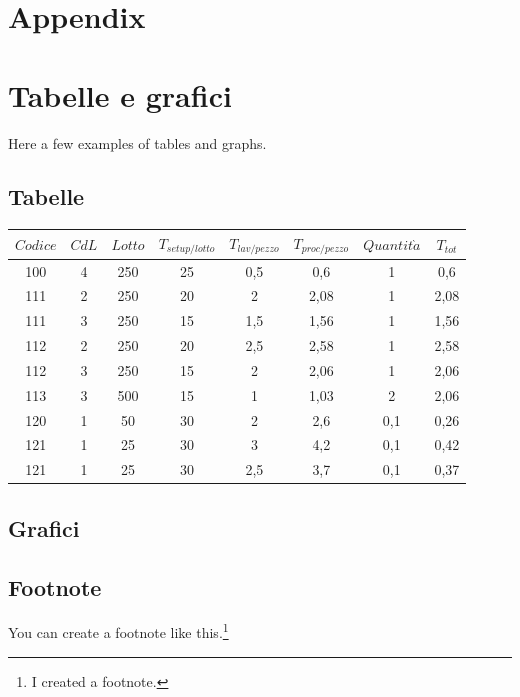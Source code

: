 \documentclass{FR16}
\begin{document}
\newpage
\section{Appendix}
%

\newpage

\section{Tabelle e grafici}
Here a few examples of tables and graphs.
\subsection{Tabelle}
\begin{center}
\begin{tabular}{c c c c c c c c}
\arrayrulecolor{Azzurro}
\hline
{\bfseries $Codice$} & {\bfseries $CdL$} & {\bfseries $Lotto$} & {\bfseries $T_{setup/lotto}$} & {\bfseries $T_{lav/pezzo}$} & {\bfseries $T_{proc/pezzo}$} & {\bfseries$Quantit\grave{a}$} & {\bfseries $T_{tot}$}\\
\hline
100 & 4 & 250 & 25 & 0,5 & 0,6 & 1 & 0,6\\
111 & 2 & 250 & 20 & 2 & 2,08 & 1 & 2,08 \\
111 & 3 & 250 & 15 & 1,5 & 1,56 & 1 & 1,56 \\
112 & 2 & 250 & 20 & 2,5 & 2,58 & 1 & 2,58 \\
112 & 3 & 250 & 15 & 2 & 2,06 & 1 & 2,06\\
113 & 3 & 500 & 15 & 1 & 1,03 & 2 & 2,06\\
120 & 1 & 50 & 30 & 2 & 2,6 & 0,1 & 0,26\\
121 & 1 & 25 & 30 & 3 & 4,2 & 0,1 & 0,42 \\
121 & 1 & 25 & 30 & 2,5 & 3,7 & 0,1 & 0,37 \\
\hline
\end{tabular}
\end{center}



\subsection{Grafici}
\begin{center}

\end{center}


\subsection{Footnote}
You can create a footnote like this.\footnote{I created a footnote.}
\end{document}
